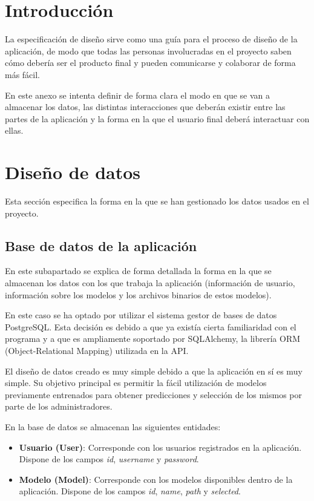 \label{cha:Especificación de diseño}

\section{Introducción}

La especificación de diseño sirve como una guía para el proceso de diseño de la
aplicación, de modo que todas las personas involucradas en el proyecto saben
cómo debería ser el producto final y pueden comunicarse y colaborar de forma más
fácil.

En este anexo se intenta definir de forma clara el modo en que se van a
almacenar los datos, las distintas interacciones que deberán existir entre las
partes de la aplicación y la forma en la que el usuario final deberá interactuar
con ellas.

\section{Diseño de datos}

Esta sección especifica la forma en la que se han gestionado los datos usados
en el proyecto.

\subsection{Base de datos de la aplicación}

En este subapartado se explica de forma detallada la forma en la que se
almacenan los datos con los que trabaja la aplicación (información de usuario,
información sobre los modelos y los archivos binarios de estos modelos).

En este caso se ha optado por utilizar el sistema gestor de bases de datos
PostgreSQL. Esta decisión es debido a que ya existía cierta familiaridad con el
programa y a que es ampliamente soportado por SQLAlchemy, la librería ORM
(Object-Relational Mapping) utilizada en la API.

El diseño de datos creado es muy simple debido a que la aplicación en sí es muy
simple. Su objetivo principal es permitir la fácil utilización de modelos
previamente entrenados para obtener predicciones y selección de los mismos por
parte de los administradores.

En la base de datos se almacenan las siguientes entidades:

\begin{itemize}
    \item \textbf{Usuario (User)}: Corresponde con los usuarios registrados en
    la aplicación. Dispone de los campos \textit{id}, \textit{username} y
    \textit{password}.
    \item \textbf{Modelo (Model)}: Corresponde con los modelos disponibles
    dentro de la aplicación. Dispone de los campos \textit{id}, \textit{name},
    \textit{path} y \textit{selected}.
\end{itemize}

